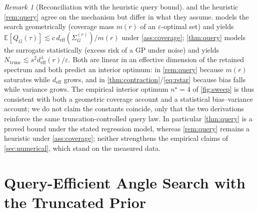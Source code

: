 \documentclass[aps,prxquantum,reprint,amsmath,amssymb,floatfix,nofootinbib,superscriptaddress,longbibliography]{revtex4-2}
\theoremstyle{remark}
\newtheorem{remark}{Remark}
\begin{document}
\begin{remark}[Reconciliation with the heuristic query bound]
\label{rem:reconcile}
 and the heuristic \cref{rem:query} agree on the mechanism but
differ in what they assume.  models the search geometrically
(coverage mass \(m(r)\) of an \(\varepsilon\)-optimal set) and yields
\(\mathbb E[Q_G(\tau)]\lesssim c\,d_{\mathrm{eff}}(\Sigma_G^{(r)})/m(r)\) under
\cref{ass:coverage}; \cref{thm:query} models the surrogate statistically (excess
risk of a GP under noise) and yields
\(N_{\mathrm{trunc}}\lesssim s^2 d_{\mathrm{eff}}^{\lambda}(r)/\varepsilon\).
Both are linear in an effective dimension of the retained spectrum and both
predict an interior optimum: in \cref{rem:query} because \(m(r)\) saturates while
\(d_{\mathrm{eff}}\) grows, and in \cref{thm:contraction}/\eqref{eq:rstar} because
bias falls while variance grows. The empirical interior optimum
\(n^{\star}{=}4\) of \cref{fig:sweep} is thus consistent with both a geometric
coverage account and a statistical bias--variance account; we do not claim the
constants coincide, only that the two derivations reinforce the same
truncation-controlled query law. In particular \cref{thm:query} is a proved bound
under the stated regression model, whereas \cref{rem:query} remains a heuristic
under \cref{ass:coverage}; neither strengthens the empirical claims of
\cref{sec:numerical}, which stand on the measured data.
\end{remark}

\section{Query-Efficient Angle Search with the Truncated Prior}
\label{sec:search}
\end{document}
